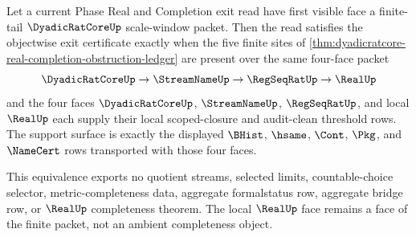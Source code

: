 \begin{theorem}
\label{thm:dyadicratcore-finite-tail-exit-certificate-equivalence}
Let a current Phase Real and Completion exit read have first visible face a finite-tail $\DyadicRatCoreUp$ scale-window packet. Then the read satisfies the objectwise exit certificate exactly when the five finite sites of \autoref{thm:dyadicratcore-real-completion-obstruction-ledger} are present over the same four-face packet
$$
\DyadicRatCoreUp \to \StreamNameUp \to \RegSeqRatUp \to \RealUp
$$
and the four faces $\DyadicRatCoreUp$, $\StreamNameUp$, $\RegSeqRatUp$, and local $\RealUp$ each supply their local scoped-closure and audit-clean threshold rows. The support surface is exactly the displayed $\BHist$, $\hsame$, $\Cont$, $\Pkg$, and $\NameCert$ rows transported with those four faces.

This equivalence exports no quotient streams, selected limits, countable-choice selector, metric-completeness data, aggregate formalstatus row, aggregate bridge row, or $\RealUp$ completeness theorem. The local $\RealUp$ face remains a face of the finite packet, not an ambient completeness object.
\end{theorem}
